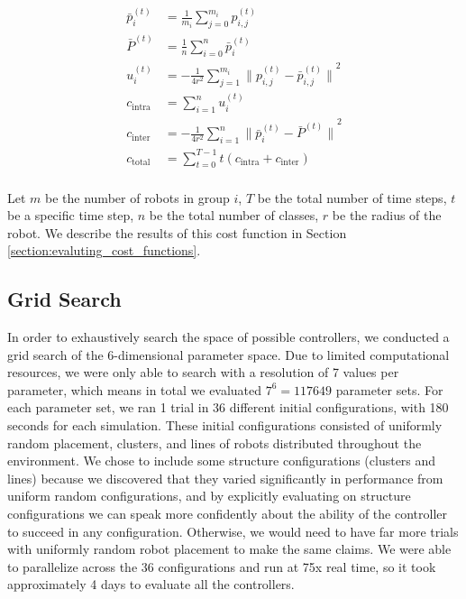 \documentclass[conference]{IEEEtran}
\begin{document}
    \begin{equation} \label{eq:centroid_cost}
      \begin{split}
        \bar{p}_i^{(t)} &= \frac{1}{m_{i}}\sum_{j=0}^{m_{i}} p_{i,j}^{(t)}\\
        \bar{P}^{(t)} &= \frac{1}{n}\sum_{i=0}^{n} \bar{p}_{i}^{(t)}\\
        u_i^{(t)} &= -\frac{1} {4r^2}\sum_{j=1}^{m_{i}}{\lVert p_{i,j}^{(t)} - \bar{p}_{i,j}^{(t)} \rVert}^2 \\
        c_{\text{intra}} &= \sum_{i=1}^n u_i^{(t)} \\
        c_{\text{inter}} &= -\frac{1} {4r^2}\sum_{i=1}^n{\lVert \bar{p}_i^{(t)} - \bar{P}^{(t)} \rVert}^2 \\
        c_{\text{total}} &=  \sum_{t=0}^{T-1} t (c_{\text{intra}} + c_{\text{inter}}) \\
      \end{split}
    \end{equation}

    Let $m$ be the number of robots in group $i$, $T$ be the total number of time steps, $t$ be a specific time step, $n$ be the total number of classes, $r$ be the radius of the robot. We describe the results of this cost function in Section \ref{section:evaluting_cost_functions}.

  \subsection{Grid Search}

    In order to exhaustively search the space of possible controllers, we conducted a grid search of the 6-dimensional parameter space. Due to limited computational resources, we were only able to search with a resolution of 7 values per parameter, which means in total we evaluated $7^6=117649$ parameter sets. For each parameter set, we ran 1 trial in 36 different initial configurations, with 180 seconds for each simulation. These initial configurations consisted of uniformly random placement, clusters, and lines of robots distributed throughout the environment. We chose to include some structure configurations (clusters and lines) because we discovered that they varied significantly in performance from uniform random configurations, and by explicitly evaluating on structure configurations we can speak more confidently about the ability of the controller to succeed in any configuration. Otherwise, we would need to have far more trials with uniformly random robot placement to make the same claims. We were able to parallelize across the 36 configurations and run at 75x real time, so it took approximately 4 days to evaluate all the controllers.
\end{document}
